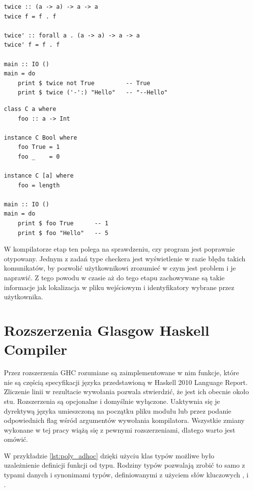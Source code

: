 {\begin{lstlisting}[float,label={lst:poly_parametric},
                   caption={Przykład użycia polimorfizmu parametrycznego w Haskellu.}]
twice :: (a -> a) -> a -> a
twice f = f . f

twice' :: forall a . (a -> a) -> a -> a
twice' f = f . f

main :: IO ()
main = do
    print $ twice not True         -- True
    print $ twice ('-':) "Hello"   -- "--Hello"
\end{lstlisting}

\begin{lstlisting}[float,label={lst:poly_adhoc},
                   caption={Przykład użycia polimorfizmu ad-hoc w Haskellu.}]
class C a where
    foo :: a -> Int

instance C Bool where
    foo True = 1
    foo _    = 0

instance C [a] where
    foo = length

main :: IO ()
main = do
    print $ foo True      -- 1
    print $ foo "Hello"   -- 5
\end{lstlisting}

W kompilatorze etap ten polega na sprawdzeniu, czy program jest poprawnie otypowany. Jednym z zadań type checkera jest wyświetlenie w razie błędu takich komunikatów, by pozwolić użytkownikowi zrozumieć w czym jest problem i je naprawić. Z tego powodu w czasie aż do tego etapu zachowywane są takie informacje jak lokalizacja w pliku wejściowym i identyfikatory wybrane przez użytkownika.

\section{Rozszerzenia Glasgow Haskell Compiler}\label{sec:rozszerzenia_ghc}

Przez rozszerzenia GHC rozumiane są zaimplementowane w nim funkcje, które nie są częścią specyfikacji języka przedstawioną w Haskell 2010 Language Report. Zliczenie linii w rezultacie wywołania  pozwala stwierdzić, że jest ich obecnie około stu. Rozszerzenia są opcjonalne i domyślnie wyłączone. Uaktywnia się je dyrektywą języka umieszczoną na początku pliku modułu lub przez podanie odpowiednich flag wśród argumentów wywołania kompilatora. Wszystkie zmiany wykonane w tej pracy wiążą się z pewnymi rozszerzeniami, dlatego warto jest omówić.

\label{sec:rodziny_typow}

W przykładzie \ref{lst:poly_adhoc} dzięki użyciu klas typów możliwe było uzależnienie definicji funkcji od typu. Rodziny typów pozwalają zrobić to samo z typami danych i synonimami typów, definiowanymi z użyciem słów kluczowych ,  i .

}
